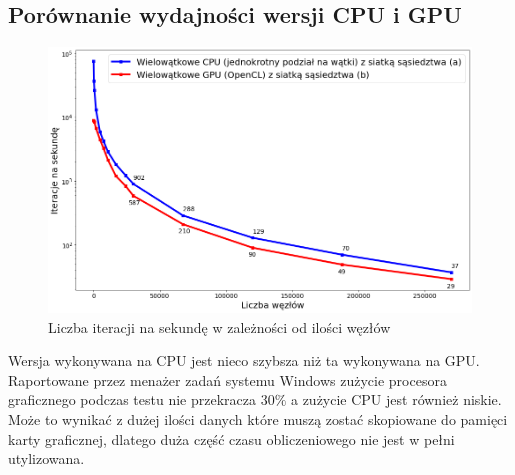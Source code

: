 \documentclass[12pt, letterpaper]{report}
\begin{document}
    \subsection{Porównanie wydajności wersji CPU i GPU}
    \begin{figure}[H]
        \centering
        \includegraphics[width=16cm]{performance_best_cpu_gpu.png}
        \caption{
            Liczba iteracji na sekundę w zależności od ilości węzłów
        }
    \end{figure}
    Wersja wykonywana na CPU jest nieco szybsza niż ta wykonywana na GPU.
    Raportowane przez menażer zadań systemu Windows zużycie procesora graficznego podczas testu
    nie przekracza $30\%$ a zużycie CPU jest również niskie. Może to wynikać z 
    dużej ilości danych które muszą zostać skopiowane do pamięci karty graficznej, dlatego 
    duża część czasu obliczeniowego nie jest w pełni utylizowana.

\end{document}
